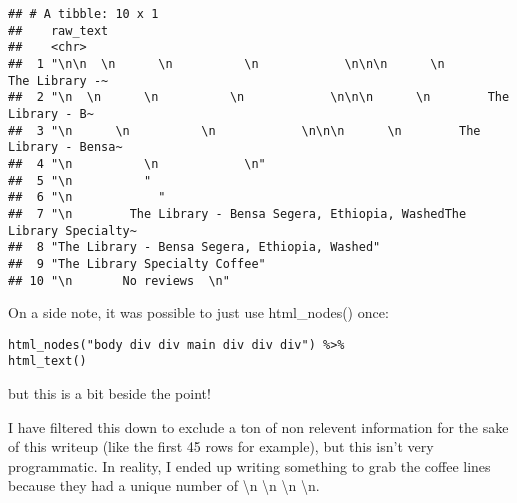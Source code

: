 \documentclass[]{article}
\newenvironment{Shaded}{\begin{snugshade}}{\end{snugshade}}
\newcommand{\CharTok}[1]{\textcolor[rgb]{0.31,0.60,0.02}{#1}}
\newcommand{\DataTypeTok}[1]{\textcolor[rgb]{0.13,0.29,0.53}{#1}}
\newcommand{\DecValTok}[1]{\textcolor[rgb]{0.00,0.00,0.81}{#1}}
\newcommand{\KeywordTok}[1]{\textcolor[rgb]{0.13,0.29,0.53}{\textbf{#1}}}
\newcommand{\NormalTok}[1]{#1}
\newcommand{\OperatorTok}[1]{\textcolor[rgb]{0.81,0.36,0.00}{\textbf{#1}}}
\newcommand{\StringTok}[1]{\textcolor[rgb]{0.31,0.60,0.02}{#1}}
\begin{document}
\begin{verbatim}
## # A tibble: 10 x 1
##    raw_text                                                                     
##    <chr>                                                                        
##  1 "\n\n  \n      \n          \n            \n\n\n      \n        The Library -~
##  2 "\n  \n      \n          \n            \n\n\n      \n        The Library - B~
##  3 "\n      \n          \n            \n\n\n      \n        The Library - Bensa~
##  4 "\n          \n            \n"                                               
##  5 "\n          "                                                               
##  6 "\n            "                                                             
##  7 "\n        The Library - Bensa Segera, Ethiopia, WashedThe Library Specialty~
##  8 "The Library - Bensa Segera, Ethiopia, Washed"                               
##  9 "The Library Specialty Coffee"                                               
## 10 "\n       No reviews  \n"
\end{verbatim}

On a side note, it was possible to just use html\_nodes() once:

\begin{verbatim}
html_nodes("body div div main div div div") %>%
html_text() 
\end{verbatim}

but this is a bit beside the point!

I have filtered this down to exclude a ton of non relevent information
for the sake of this writeup (like the first 45 rows for example), but
this isn't very programmatic. In reality, I ended up writing something
to grab the coffee lines because they had a unique number of
\textbackslash{}n \textbackslash{}n \textbackslash{}n \textbackslash{}n.

\begin{Shaded}
\end{Shaded}
\end{document}
